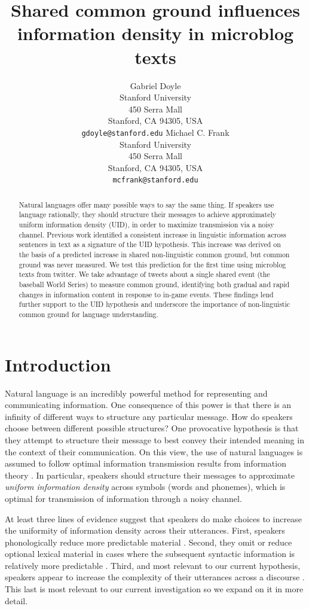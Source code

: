 \documentclass[11pt,letterpaper]{article}
\title{Shared common ground influences information density in microblog texts\Thanks{Thanks to...}}
\author{Gabriel Doyle\\
	    Stanford University\\
	    450 Serra Mall\\
	    Stanford, CA 94305, USA\\
	    {\tt gdoyle@stanford.edu}
	  \And
          Michael C. Frank\\
	    Stanford University\\
	    450 Serra Mall\\
	    Stanford, CA 94305, USA\\
	    {\tt mcfrank@stanford.edu}}
\date{}
\begin{document}
\maketitle
\begin{abstract}
Natural languages offer many possible ways to say the same thing. If speakers use language rationally, they should structure their messages to achieve approximately uniform information density (UID), in order to maximize transmission via a noisy channel. Previous work identified a consistent increase in linguistic information across sentences in text as a signature of the UID hypothesis. This increase was derived on the basis of a predicted increase in shared non-linguistic common ground, but common ground was never measured. We test this prediction for the first time using microblog texts from twitter. We take advantage of tweets about a single shared event (the baseball World Series) to measure common ground, identifying both gradual and rapid changes in information content in response to in-game events. These findings lend further support to the UID hypothesis and underscore the importance of non-linguistic common ground for language understanding.
\end{abstract}

\section{Introduction}

Natural language is an incredibly powerful method for representing and communicating information. One consequence of this power is that there is an infinity of different ways to structure any particular message. How do speakers choose between different possible structures? One provocative hypothesis is that they attempt to structure their message to best convey their intended meaning in the context of their communication. On this view, the use of natural languages is assumed to follow optimal information transmission results from information theory \cite{shannon1948}. In particular, speakers should structure their messages to approximate \emph{uniform information density} across symbols (words and phonemes), which is optimal for transmission of information through a noisy channel. 

At least three lines of evidence suggest that speakers do make choices to increase the uniformity of information density across their utterances. First, speakers phonologically reduce more predictable material \cite{aylett2004,aylett2006}. Second, they omit or reduce optional lexical material in cases where the subsequent syntactic information is relatively more predictable \cite{levy2007,frank2008,jaeger2010}. Third, and most relevant to our current hypothesis, speakers appear to increase the complexity of their utterances across a discourse \cite{genzel2002,genzel2003,qian2012}. This last is most relevant to our current investigation so we expand on it in more detail.
\end{document}
